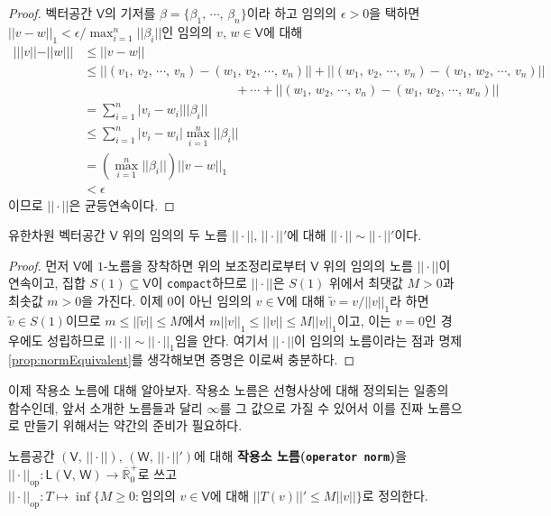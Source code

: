\begin{proof}
    벡터공간 $\mathsf{V}$의 기저를 $\beta=\{\beta_1,\,\cdots,\,\beta_n\}$이라 하고 임의의 $\epsilon>0$을 택하면 $||v-w||_1<\epsilon/\max_{i=1}^n||\beta_i||$인 임의의 $v,\,w\in\mathsf{V}$에 대해
    \begin{align*}
        |||v||-||w|||&\leq||v-w||\\
        &\leq||(v_1,\,v_2,\,\cdots,\,v_n)-(w_1,\,v_2,\,\cdots,\,v_n)||+||(w_1,\,v_2,\,\cdots,\,v_n)-(w_1,\,w_2,\,\cdots,\,v_n)||\\
        &\qquad\qquad\qquad\qquad\qquad\qquad+\cdots+||(w_1,\,w_2,\,\cdots,\,v_n)-(w_1,\,w_2,\,\cdots,\,w_n)||\\
        &=\sum_{i=1}^n|v_i-w_i|||\beta_i||\\
        &\leq\sum_{i=1}^n|v_i-w_i|\max_{i=1}^n||\beta_i||\\
        &=(\max_{i=1}^n||\beta_i||)||v-w||_1\\
        &<\epsilon
    \end{align*}
    이므로 $||\cdot||$은 균등연속이다.
\end{proof}

\begin{theorem}\label{thm:normEquiv}
    유한차원 벡터공간 $\mathsf{V}$ 위의 임의의 두 노름 $||\cdot||,\,||\cdot||'$에 대해 $||\cdot||\sim||\cdot||'$이다.
\end{theorem}

\begin{proof}
    먼저 $\mathsf{V}$에 $1$-노름을 장착하면 위의 보조정리로부터 $\mathsf{V}$ 위의 임의의 노름 $||\cdot||$이 연속이고, 집합 $S(1)\subseteq\mathsf{V}$이 \texttt{compact}하므로 $||\cdot||$은 $S(1)$ 위에서 최댓값 $M>0$과 최솟값 $m>0$을 가진다. 이제 $0$이 아닌 임의의 $v\in\mathsf{V}$에 대해 $\widetilde{v}=v/||v||_1$라 하면 $\widetilde{v}\in S(1)$이므로 $m\leq||\widetilde{v}||\leq M$에서 $m||v||_1\leq||v||\leq M||v||_1$이고, 이는 $v=0$인 경우에도 성립하므로 $||\cdot||\sim||\cdot||_1$임을 안다. 여기서 $||\cdot||$이 임의의 노름이라는 점과 명제 \ref{prop:normEquivalent}를 생각해보면 증명은 이로써 충분하다.
\end{proof}

이제 작용소 노름에 대해 알아보자. 작용소 노름은 선형사상에 대해 정의되는 일종의 함수인데, 앞서 소개한 노름들과 달리 $\infty$를 그 값으로 가질 수 있어서 이를 진짜 노름으로 만들기 위해서는 약간의 준비가 필요하다.

\begin{definition}
    노름공간 $(\mathsf{V},\,||\cdot||),\,(\mathsf{W},\,||\cdot||')$에 대해 \textbf{작용소 노름(\texttt{operator norm})}을 $||\cdot||_\mathrm{op}:\mathsf{L}(\mathsf{V},\,\mathsf{W})\to\overline{\mathbb{R}}_0^+$로 쓰고 $||\cdot||_\mathrm{op}:T\mapsto\inf\{M\geq0:\textrm{임의의 $v\in\mathsf{V}$에 대해 $||T(v)||'\leq M||v||$}\}$로 정의한다.
\end{definition}

